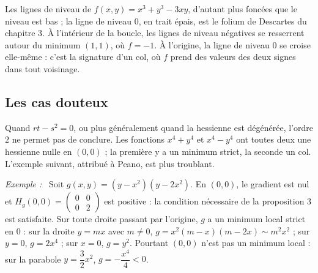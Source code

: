 \documentclass[a4paper,twoside]{report}
\newenvironment{exemple}%
 {\par\needspace{6\baselineskip}\vspace{1mm}\begin{list}{}{\leftmargin=1cm \rightmargin=0.5cm}\item[]%
  \textit{Exemple :}~}%
 {\end{list}\vspace{1mm}}
\newcommand{\Hs}{H}                               %
\begin{document}
\noindent Les lignes de niveau de $f(x, y) = x^{3} + y^{3} - 3xy$, d'autant plus foncées que le niveau est bas ; la ligne de niveau $0$, en trait épais, est le folium de Descartes du chapitre 3. À l'intérieur de la boucle, les lignes de niveau négatives se resserrent autour du minimum $(1, 1)$, où $f = -1$. À l'origine, la ligne de niveau $0$ se croise elle-même : c'est la signature d'un col, où $f$ prend des valeurs des deux signes dans tout voisinage.

\subsection{Les cas douteux}

Quand $rt - s^{2} = 0$, ou plus généralement quand la hessienne est dégénérée, l'ordre $2$ ne permet pas de conclure. Les fonctions $x^{4} + y^{4}$ et $x^{4} - y^{4}$ ont toutes deux une hessienne nulle en $(0, 0)$ ; la première y a un minimum strict, la seconde un col. L'exemple suivant, attribué à Peano, est plus troublant.

\begin{exemple}
Soit $g(x, y) = (y - x^{2})(y - 2x^{2})$. En $(0, 0)$, le gradient est nul et $\Hs_{g}(0, 0) = \begin{pmatrix} 0 & 0 \\ 0 & 2 \end{pmatrix}$ est positive : la condition nécessaire de la proposition 3 est satisfaite. Sur toute droite passant par l'origine, $g$ a un minimum local strict en $0$ : sur la droite $y = mx$ avec $m \neq 0$, $g = x^{2}(m - x)(m - 2x) \sim m^{2}x^{2}$ ; sur $y = 0$, $g = 2x^{4}$ ; sur $x = 0$, $g = y^{2}$. Pourtant $(0, 0)$ n'est pas un minimum local : sur la parabole $y = \dfrac{3}{2}x^{2}$, $g = -\dfrac{x^{4}}{4} < 0$.
\end{exemple}

\begin{center}
\end{center}
\end{document}
